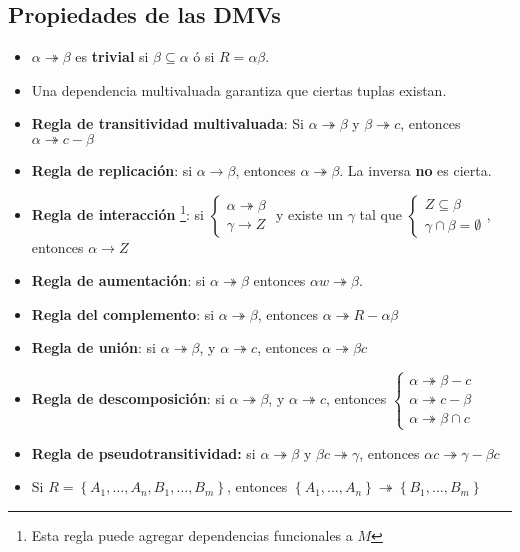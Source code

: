 \documentclass[a4paper, twoside]{article}
\begin{document}
\subsection{Propiedades de las DMVs}
\begin{itemize}
	\item $\alpha\twoheadrightarrow\beta$ es \textbf{trivial} si $\beta\subseteq\alpha$ ó si $R=\alpha\beta$.
	\item Una dependencia multivaluada garantiza que ciertas tuplas existan.
	\item \textbf{Regla de transitividad} \textbf{multivaluada}: Si $\alpha\twoheadrightarrow\beta$ y $\beta\twoheadrightarrow c$, entonces $\alpha\twoheadrightarrow c-\beta$
	\item \textbf{Regla de replicación}: si $\alpha\to\beta$, entonces $\alpha\twoheadrightarrow\beta$. La inversa \textbf{no} es cierta.
	\item \textbf{Regla de interacción} \footnote{Esta regla puede agregar dependencias funcionales a $M$}: si 			$\begin{cases}
		\alpha\twoheadrightarrow\beta\\
		\gamma\to Z
	\end{cases}$ y existe un $\gamma$ tal que
	$\begin{cases}
		Z\subseteq\beta\\
		\gamma\cap\beta=\emptyset
	\end{cases}$, entonces $\alpha\to Z$
	\item \textbf{Regla de aumentación}: si $\alpha\twoheadrightarrow\beta$ entonces $\alpha w\twoheadrightarrow\beta$.
	\item \textbf{Regla del complemento}: si $\alpha\twoheadrightarrow\beta$, entonces $\alpha\twoheadrightarrow R-\alpha\beta$
	\item \textbf{Regla de unión}: si $\alpha\twoheadrightarrow\beta$, y $\alpha\twoheadrightarrow c$, entonces $\alpha\twoheadrightarrow\beta c$
	\item \textbf{Regla de descomposición}: si $\alpha\twoheadrightarrow\beta$, y $\alpha\twoheadrightarrow c$, entonces 
	$\begin{cases}
		\alpha\twoheadrightarrow\beta-c\\
		\alpha\twoheadrightarrow c-\beta\\
		\alpha\twoheadrightarrow\beta\cap c
	\end{cases}$
	\item \textbf{Regla de pseudotransitividad:} si $\alpha\twoheadrightarrow\beta$ y $\beta c\twoheadrightarrow\gamma$, entonces $\alpha c\twoheadrightarrow\gamma-\beta c$
	\item Si $R=\left\{ A_{1},\ldots,A_{n},B_{1},\ldots,B_{m}\right\} $, entonces $\left\{ A_{1}, \ldots, A_{n} \right\} \twoheadrightarrow \left\{ B_{1}, \ldots, B_{m} \right\}$
\end{itemize}
\end{document}
